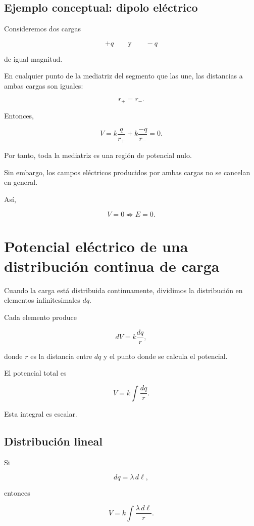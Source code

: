 \subsection{Ejemplo conceptual: dipolo eléctrico}

Consideremos dos cargas

\[
+q
\qquad\text{y}\qquad
-q
\]

de igual magnitud.

En cualquier punto de la mediatriz del segmento que las une, las distancias a ambas
cargas son iguales:

\[
r_+=r_-.
\]

Entonces,

\[
V
=
k\frac{q}{r_+}
+
k\frac{-q}{r_-}
=0.
\]

Por tanto, toda la mediatriz es una región de potencial nulo.

Sin embargo, los campos eléctricos producidos por ambas cargas no se cancelan en
general.

Así,

\[
\boxed{
V=0
\not\Rightarrow
E=0
}.
\]


\section{Potencial eléctrico de una distribución continua de carga}

Cuando la carga está distribuida continuamente, dividimos la distribución en elementos
infinitesimales \(dq\).

Cada elemento produce

\[
dV=k\frac{dq}{r},
\]

donde \(r\) es la distancia entre \(dq\) y el punto donde se calcula el potencial.

El potencial total es

\begin{equation}
\boxed{
V=k\int\frac{dq}{r}
}.
\end{equation}

Esta integral es escalar.


\subsection{Distribución lineal}

Si

\[
dq=\lambda\,d\ell,
\]

entonces

\begin{equation}
\boxed{
V=k\int\frac{\lambda\,d\ell}{r}
}.
\end{equation}


